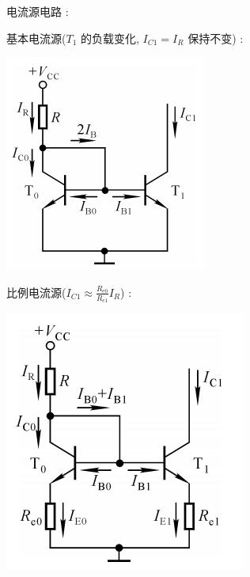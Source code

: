 \documentclass[UTF8, 12pt]{ctexart}
\begin{document}
	\noindent
	电流源电路 :

	基本电流源($ T_{1} $ 的负载变化, $ I_{C1} = I_{R} $ 保持不变) :

	\includegraphics[]{03/基本电流源电路图.png}

	比例电流源($ I_{C1} \approx \frac{R_{e0}}{R_{e1}}I_{R} $) :

	\includegraphics[]{03/比例电流源电路图.png}
\end{document}
